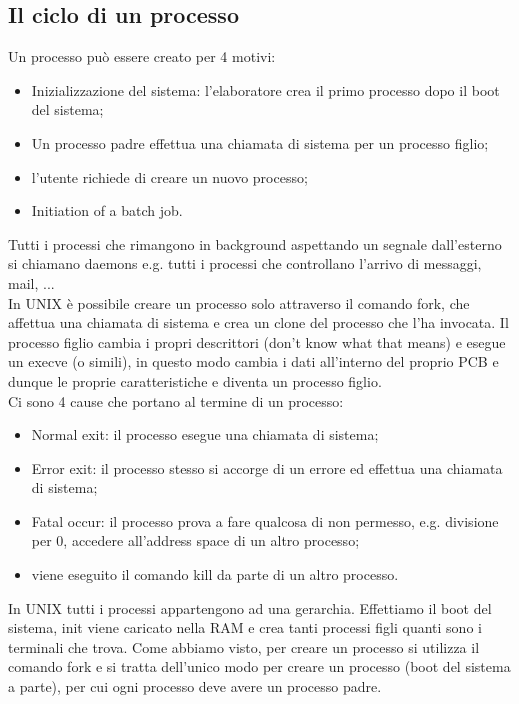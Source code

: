 \documentclass{article}
\begin{document}
\subsection{Il ciclo di un processo}
Un processo può essere creato per 4 motivi:
\begin{itemize}
  \item Inizializzazione del sistema: l'elaboratore crea il primo processo dopo il boot del sistema;

  \item Un processo padre effettua una chiamata di sistema per un processo figlio;

  \item l'utente richiede di creare un nuovo processo;

  \item Initiation of a batch job.
\end{itemize}

Tutti i processi che rimangono in background aspettando un segnale dall'esterno si chiamano daemons e.g. tutti i processi che controllano l'arrivo di messaggi, mail, ...\\

In UNIX è possibile creare un processo solo attraverso il comando fork, che affettua una chiamata di sistema e crea un clone del processo che l'ha invocata. Il processo figlio cambia i propri descrittori (don't know what that means) e esegue un execve (o simili), in questo modo cambia i dati all'interno del proprio PCB e dunque le proprie caratteristiche e diventa un processo figlio.\\

Ci sono 4 cause che portano al termine di un processo:
\begin{itemize}
  \item Normal exit: il processo esegue una chiamata di sistema;

  \item Error exit: il processo stesso si accorge di un errore ed effettua una chiamata di sistema;

  \item Fatal occur: il processo prova a fare qualcosa di non permesso, e.g. divisione per 0, accedere all'address space di un altro processo;

  \item viene eseguito il comando kill da parte di un altro processo.
\end{itemize}

In UNIX tutti i processi appartengono ad una gerarchia. Effettiamo il boot del sistema, init viene caricato nella RAM e crea tanti processi figli quanti sono i terminali che trova. Come abbiamo visto, per creare un processo si utilizza il comando fork e si tratta dell'unico modo per creare un processo (boot del sistema a parte), per cui ogni processo deve avere un processo padre.
\end{document}
